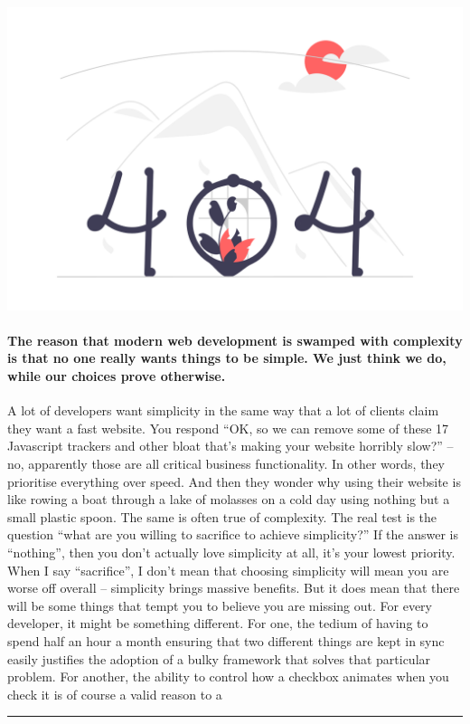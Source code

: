 \documentclass[10pt,a4paper]{article}
\begin{document}
\begin{minipage}[t]{0.80\linewidth}
\vspace{0pt}
\begin{multicols}{2}

    \href{https://lukeplant.me.uk/blog/posts/no-one-actually-wants-simplicity/?utm\_source=hackernewsletter\&utm\_medium=email\&utm\_term=fav}{
        \includegraphics[width=0.99\linewidth]{notfound.png}
    }
  
\paragraph{The reason that modern web development is swamped with complexity is that no one really wants things to be simple. We just think we do, while our choices prove otherwise.}

A lot of developers want simplicity in the same way that a lot of clients claim they want a fast website. You respond “OK, so we can remove some of these 17 Javascript trackers and other bloat that’s making your website horribly slow?” – no, apparently those are all critical business functionality.
In other words, they prioritise everything over speed. And then they wonder why using their website is like rowing a boat through a lake of molasses on a cold day using nothing but a small plastic spoon.
The same is often true of complexity. The real test is the question “what are you willing to sacrifice to achieve simplicity?” If the answer is “nothing”, then you don’t actually love simplicity at all, it’s your lowest priority.
When I say “sacrifice”, I don’t mean that choosing simplicity will mean you are worse off overall – simplicity brings massive benefits. But it does mean that there will be some things that tempt you to believe you are missing out.
For every developer, it might be something different. For one, the tedium of having to spend half an hour a month ensuring that two different things are kept in sync easily justifies the adoption of a bulky framework that solves that particular problem. For another, the ability to control how a checkbox animates when you check it is of course a valid reason to a

\end{multicols}
\end{minipage}
\par\medskip
\noindent\textcolor{red}{\rule{\linewidth}{0.2mm}}
\end{document}
